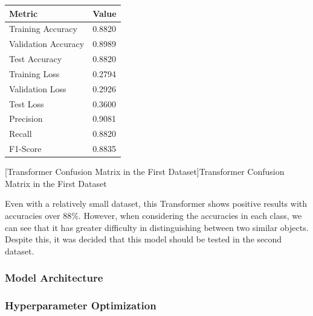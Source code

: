 \begin{minipage}{0.35\textwidth}
    \label{table:transformer_dataset1_results}
    \centering
    \begin{tabular}{ |p{3.4cm}|p{1.1cm}| }
    \hline
    Metric & Value \\
    \hline
    Training Accuracy & 0.8820 \\
    \hline
    Validation Accuracy & 0.8989 \\
    \hline
    Test Accuracy & 0.8820 \\
    \hline
    Training Loss & 0.2794 \\
    \hline
    Validation Loss & 0.2926 \\
    \hline
    Test Loss & 0.3600 \\
    \hline
    Precision & 0.9081 \\
    \hline
    Recall & 0.8820 \\
    \hline
    F1-Score & 0.8835 \\
    \hline
    \end{tabular}
\end{minipage}%
\begin{minipage}{0.65\textwidth}
    \centering
    
    [Transformer Confusion Matrix in the First Dataset]{Transformer Confusion Matrix in the First Dataset}
    \label{fig:transformer_confusion_matrix}
\end{minipage}

\kern 0.1cm

Even with a relatively small dataset, this Transformer shows positive results with accuracies over 88\%. However, when considering the accuracies in each class, we can see that it has greater difficulty in distinguishing between two similar objects. Despite this, it was decided that this model should be tested in the second dataset.

\subsubsection{Model Architecture}

\subsubsection{Hyperparameter Optimization}

